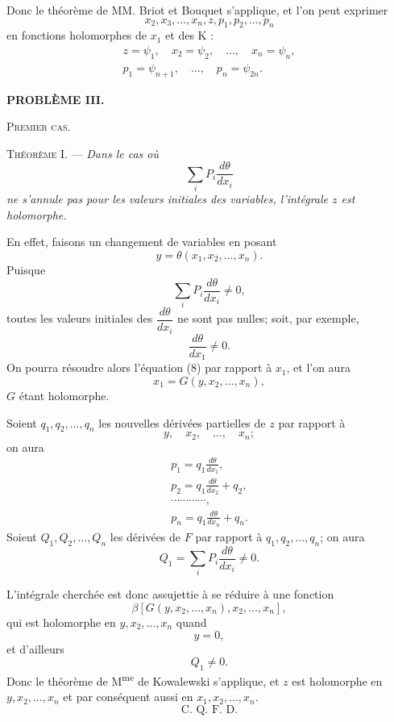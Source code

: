 \documentclass[11pt]{article}
\begin{document}
Donc le théorème de MM. Briot et Bouquet s’applique, et l’on peut exprimer\[x_2,x_3,\ldots,x_n,z,p_1,p_2,\ldots,p_n\]en fonctions holomorphes de $x_1$ et des K :
\begin{equation*}\tag{6}
\begin{gathered}
z=\psi_1,\quad x_2=\psi_2,\quad \ldots,\quad x_n=\psi_n,\\
p_1=\psi_{n+1},\quad \ldots,\quad p_n=\psi_{2n}.
\end{gathered}
\end{equation*}

\begin{center}
\textbf{PROBLÈME III.}
\end{center}

\begin{center}
\textsc{Premier cas.}
\end{center}

\noindent\textsc{Théorème I.} — \emph{Dans le cas où}
\[
\sum_i P_i\frac{d\theta}{dx_i}
\]
\emph{ne s’annule pas pour les valeurs initiales des variables, l’intégrale $z$ est holomorphe.}

En effet, faisons un changement de variables en posant
\begin{equation*}\tag{8}
y=\theta(x_1,x_2,\ldots,x_n).
\end{equation*}
Puisque
\begin{equation*}\tag{9}
\sum_i P_i\frac{d\theta}{dx_i}\ne0,
\end{equation*}
toutes les valeurs initiales des $\dfrac{d\theta}{dx_i}$ ne sont pas nulles; soit, par exemple,
\[
\frac{d\theta}{dx_1}\ne0.
\]
On pourra résoudre alors l’équation (8) par rapport à $x_1$, et l’on aura
\[
x_1=G(y,x_2,\ldots,x_n),
\]
$G$ étant holomorphe.

Soient $q_1,q_2,\ldots,q_n$ les nouvelles dérivées partielles de $z$ par rapport à
\[
y,\quad x_2,\quad \ldots,\quad x_n;
\]
on aura
\[
\begin{gathered}
p_1=q_1\frac{d\theta}{dx_1},\\
p_2=q_1\frac{d\theta}{dx_2}+q_2,\\
\cdots\cdots\cdots\cdots,\\
p_n=q_1\frac{d\theta}{dx_n}+q_n.
\end{gathered}
\]
Soient $Q_1,Q_2,\ldots,Q_n$ les dérivées de $F$ par rapport à $q_1,q_2,\ldots,q_n$; on aura
\[
Q_1=\sum_i P_i\frac{d\theta}{dx_i}\ne0.
\]

L’intégrale cherchée est donc assujettie à se réduire à une fonction
\[
\beta[G(y,x_2,\ldots,x_n),x_2,\ldots,x_n],
\]
qui est holomorphe en $y,x_2,\ldots,x_n$ quand
\[
y=0,
\]
et d’ailleurs
\[
Q_1\ne0.
\]
Donc le théorème de M\textsuperscript{me} de Kowalewski s’applique, et $z$ est holomorphe en $y,x_2,\ldots,x_n$ et par conséquent aussi en $x_1,x_2,\ldots,x_n$.
\[
\text{C. Q. F. D.}
\]
\end{document}
